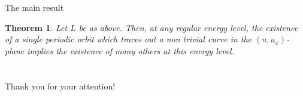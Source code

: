 \documentclass[9pt, english]{beamer}
\newtheorem{thm}{Theorem}
\theoremstyle{definition}
\begin{document}
\begin{frame}{The main result}
    \begin{thm}
    Let $L$ be as above. Then, at any regular energy level, the
    existence of a single periodic orbit which traces out a non
    trivial curve in the $(u, u_x)$-plane implies the existence of
    {\color{red}{infinitely}\/} many others at this energy level.
    \end{thm}
\end{frame}

\appendix
\section{}
\begin{frame}{}
\begin{center}
\begin{Large}
\alert{Thank you for your attention!}
\end{Large}
\end{center}
\end{frame}
\end{document}

